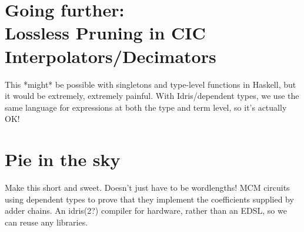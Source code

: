 \documentclass[conference]{IEEEtran}
\begin{document}

\section{Going further:\\Lossless Pruning in CIC Interpolators/Decimators}

This *might* be possible with singletons and type-level functions in Haskell,
but it would be extremely, extremely painful. With Idris/dependent types, we use
the same language for expressions at both the type and term level, so it's
actually OK!

\section{Pie in the sky}

Make this short and sweet. Doesn't just have to be wordlengths!
MCM circuits using dependent types to prove that they implement the coefficients
supplied by adder chains. An idris(2?) compiler for hardware, rather than an
EDSL, so we can reuse any libraries.
\end{document}

